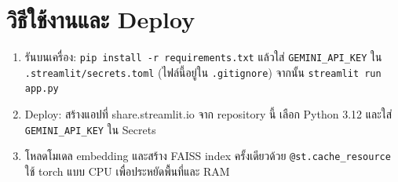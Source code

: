 \documentclass[11pt,a4paper]{article}
\begin{document}
\section{วิธีใช้งานและ Deploy}
\begin{enumerate}
  \item รันบนเครื่อง: \texttt{pip install -r requirements.txt} แล้วใส่ \texttt{GEMINI\_API\_KEY} ใน \texttt{.streamlit/secrets.toml} (ไฟล์นี้อยู่ใน \texttt{.gitignore}) จากนั้น \texttt{streamlit run app.py}
  \item Deploy: สร้างแอปที่ share.streamlit.io จาก repository นี้ เลือก Python 3.12 และใส่ \texttt{GEMINI\_API\_KEY} ใน Secrets
  \item โหลดโมเดล embedding และสร้าง FAISS index ครั้งเดียวด้วย \texttt{@st.cache\_resource} ใช้ torch แบบ CPU เพื่อประหยัดพื้นที่และ RAM
\end{enumerate}
\end{document}
